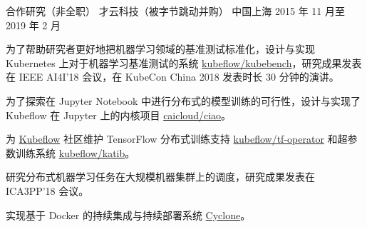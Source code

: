 \begin{cventries}
  \cventry
    {合作研究（非全职）} %
    {才云科技（被字节跳动并购）} %
    {中国上海} %
    {2015 年 11 月至 2019 年 2 月} %
    {
      \begin{cvitems} %
        \item 为了帮助研究者更好地把机器学习领域的基准测试标准化，设计与实现 Kubernetes 上对于机器学习基准测试的系统 \href{https://github.com/kubeflow/kubebench}{kubeflow/kubebench}，研究成果发表在 IEEE AI4I'18 会议，在 KubeCon China 2018 发表时长 30 分钟的演讲。
        \item 为了探索在 Jupyter Notebook 中进行分布式的模型训练的可行性，设计与实现了 Kubeflow 在 Jupyter 上的内核项目 \href{https://github.com/caicloud/ciao}{caicloud/ciao}。
        \item 为 \href{https://github.com/kubeflow/kubeflow}{Kubeflow} 社区维护 TensorFlow 分布式训练支持 \href{https://github.com/kubeflow/tf-operator}{kubeflow/tf-operator} 和超参数训练系统 \href{https://github.com/kubeflow/katib}{kubeflow/katib}。
        \item 研究分布式机器学习任务在大规模机器集群上的调度，研究成果发表在 ICA3PP'18 会议。
        \item 实现基于 Docker 的持续集成与持续部署系统 \href{https://github.com/caicloud/cyclone}{Cyclone}。
      \end{cvitems}
    }

\end{cventries}
